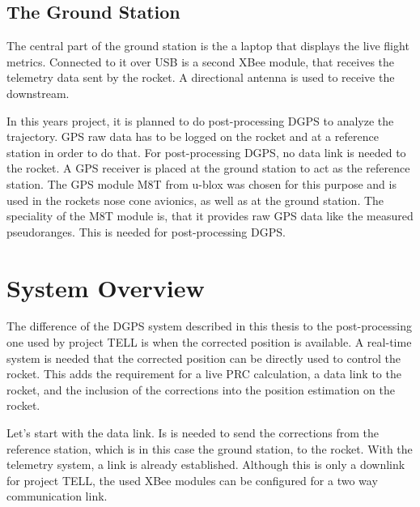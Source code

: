 \subsection{The Ground Station}

The central part of the ground station is the a laptop that displays the live flight metrics.
Connected to it over USB is a second XBee module, that receives the telemetry data sent by the rocket.
A directional antenna is used to receive the downstream.

In this years project, it is planned to do post-processing DGPS to analyze the trajectory.
GPS raw data has to be logged on the rocket and at a reference station in order to do that.
For post-processing DGPS, no data link is needed to the rocket.
A GPS receiver is placed at the ground station to act as the reference station.
The GPS module M8T from u-blox was chosen for this purpose and is used in the rockets nose cone avionics, as well as at the ground station.
The speciality of the M8T module is, that it provides raw GPS data like the measured pseudoranges.
This is needed for post-processing DGPS.


\section{System Overview}\label{sec:system_overview}

The difference of the DGPS system described in this thesis to the post-processing one used by project TELL is when the corrected position is available.
A real-time system is needed that the corrected position can be directly used to control the rocket.
This adds the requirement for a live PRC calculation, a data link to the rocket, and the inclusion of the corrections into the position estimation on the rocket.

Let's start with the data link.
Is is needed to send the corrections from the reference station, which is in this case the ground station, to the rocket.
With the telemetry system, a link is already established.
Although this is only a downlink for project TELL, the used XBee modules can be configured for a two way communication link.

